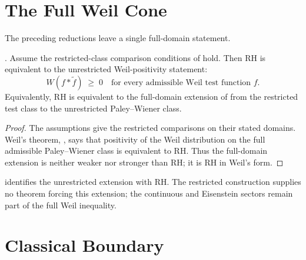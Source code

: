 \section{The Full Weil Cone}
\label{v4-arith:w5-direct:irreducible-residual}

The preceding reductions leave a single full-domain statement.

\begin{theorem}
\label{v4-arith:w5-direct:thm:irreducible-residual}
\ClaimStatusProvedHere. Assume the restricted-class comparison
conditions of  hold. Then RH is equivalent to
the unrestricted Weil-positivity statement:
\begin{equation}
\label{v4-arith:w5-direct:eq:irreducible}
W(f\ast\widetilde f)\;\geq\;0\quad\text{for every admissible Weil test function }f.
\end{equation}
Equivalently, RH is equivalent to the full-domain extension of
 from the restricted test
class to the unrestricted Paley--Wiener class.
\end{theorem}

\begin{proof}
The assumptions give the restricted comparisons on their stated
domains.  Weil's theorem,
, says that positivity of
the Weil distribution on the full admissible Paley--Wiener class is
equivalent to RH.  Thus the full-domain extension is neither weaker
nor stronger than RH; it is RH in Weil's form.
\end{proof}

\begin{remark}
\label{v4-arith:w5-direct:rem:reduction-honesty}
 identifies the
unrestricted extension with RH.  The restricted construction supplies
no theorem forcing this extension; the continuous and Eisenstein
sectors remain part of the full Weil inequality.
\end{remark}

\section{Classical Boundary}
\label{v4-arith:w5-direct:recap}

